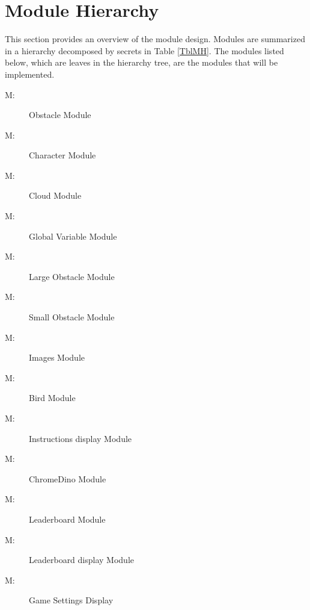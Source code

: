 \documentclass[12pt, titlepage]{article}
\newcounter{mnum}
\newcommand{\mthemnum}{M\themnum}
\begin{document}
\section{Module Hierarchy} \label{SecMH}

This section provides an overview of the module design. Modules are summarized
in a hierarchy decomposed by secrets in Table \ref{TblMH}. The modules listed
below, which are leaves in the hierarchy tree, are the modules that will be implemented.

\begin{description}
\item [ \mthemnum \label{mHH}:] Obstacle Module
\item [ \mthemnum \label{mHH}:] Character Module
\item [ \mthemnum \label{mHH}:] Cloud Module
\item [ \mthemnum \label{mHH}:] Global Variable Module
\item [ \mthemnum \label{mHH}:] Large Obstacle Module
\item [ \mthemnum \label{mHH}:] Small Obstacle Module
\item [ \mthemnum \label{mHH}:] Images Module
\item [ \mthemnum \label{mHH}:] Bird Module
\item [ \mthemnum \label{mHH}:] Instructions display Module
\item [ \mthemnum \label{mHH}:] ChromeDino Module
\item [ \mthemnum \label{mHH}:] Leaderboard Module
\item [ \mthemnum \label{mHH}:] Leaderboard display Module
\item [ \mthemnum \label{mHH}:] Game Settings Display

\end{description}

\end{document}
